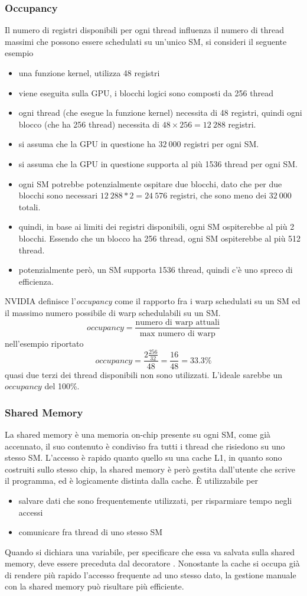 \documentclass[10pt, letterpaper]{report}
\begin{document}
\subsubsection{Occupancy}
Il numero di registri disponibili per ogni thread influenza il numero di thread massimi che possono essere schedulati su un'unico SM, si consideri il seguente esempio\begin{itemize}
    \item una funzione kernel, utilizza 48 registri 
    \item viene eseguita sulla GPU, i blocchi logici sono composti da 256 thread 
    \item ogni thread (che esegue la funzione kernel) necessita di 48 registri, quindi ogni blocco (che ha 256 thread) necessita di $48\times 256=12\ 288$ registri.
    \item si assuma che la GPU in questione ha $32 \ 000$ registri per ogni SM. 
    \item si assuma che la GPU in questione supporta al più 1536 thread per ogni SM. 
    \item ogni SM potrebbe potenzialmente ospitare due blocchi, dato che per due blocchi sono necessari $12\ 288*2=24\ 576$ registri, che sono meno dei $32\ 000$ totali.
    \item quindi, in base ai limiti dei registri disponibili, ogni SM ospiterebbe al più 2 blocchi. Essendo che un blocco ha 256 thread, ogni SM ospiterebbe al più 512 thread.
    \item potenzialmente però, un SM supporta 1536 thread, quindi c'è uno spreco di efficienza.
\end{itemize}
NVIDIA definisce l'\textit{occupancy} come il rapporto fra i warp schedulati su un SM ed il massimo numero possibile di warp schedulabili su un SM.
$$ occupancy=\frac{\text{numero di warp attuali}}{\text{max numero di warp}}$$
nell'esempio riportato 
$$ occupancy = \frac{2\frac{256}{32}}{48}=\frac{16}{48}=33.3\%$$
quasi due terzi dei thread disponibili non sono utilizzati. L'ideale sarebbe un $occupancy$ del 100\%.
\subsubsection{Shared Memory}
La shared memory è una memoria on-chip presente su ogni SM, come già accennato, il suo contenuto è condiviso fra tutti i thread che risiedono su uno stesso SM. L'accesso è rapido quanto quello su una cache L1, in quanto sono costruiti sullo stesso chip, la shared memory è però gestita dall'utente che scrive il programma, ed è logicamente distinta dalla cache. È utilizzabile per\begin{itemize}
    \item salvare dati che sono frequentemente utilizzati, per risparmiare tempo negli accessi 
    \item comunicare fra thread di uno stesso SM
\end{itemize}
Quando si dichiara una variabile, per specificare che essa va salvata sulla shared memory, deve essere preceduta dal decoratore . Nonostante la cache si occupa già di rendere più rapido l'accesso frequente ad uno stesso dato, la gestione manuale con la shared memory può risultare più efficiente.
\end{document}
